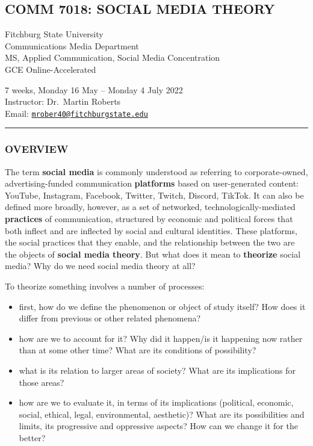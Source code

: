 \documentclass[]{tufte-handout}
\author{Martin Roberts}
\date{2022-05-13}
\providecommand{\tightlist}{%
  \setlength{\itemsep}{0pt}\setlength{\parskip}{0pt}}
\begin{document}
\hypertarget{comm-7018-social-media-theory}{%
\subsection{COMM 7018: SOCIAL MEDIA
THEORY}\label{comm-7018-social-media-theory}}

Fitchburg State University\\
Communications Media Department\\
MS, Applied Communication, Social Media Concentration\\
GCE Online-Accelerated

7 weeks, Monday 16 May -- Monday 4 July 2022\\
Instructor: Dr.~Martin Roberts\\
Email:
\href{mailto:mrober40@fitchburgstate.edu}{\nolinkurl{mrober40@fitchburgstate.edu}}

\begin{center}\rule{0.5\linewidth}{0.5pt}\end{center}

\hypertarget{overview}{%
\subsubsection{OVERVIEW}\label{overview}}

The term \textbf{social media} is commonly understood as referring to
corporate-owned, advertising-funded communication \textbf{platforms}
based on user-generated content: YouTube, Instagram, Facebook, Twitter,
Twitch, Discord, TikTok. It can also be defined more broadly, however,
as a set of networked, technologically-mediated \textbf{practices} of
communication, structured by economic and political forces that both
inflect and are inflected by social and cultural identities. These
platforms, the social practices that they enable, and the relationship
between the two are the objects of \textbf{social media theory}. But
what does it mean to \textbf{theorize} social media? Why do we need
social media theory at all?

To theorize something involves a number of processes:

\begin{itemize}
\tightlist
\item
  first, how do we define the phenomenon or object of study itself? How
  does it differ from previous or other related phenomena?
\item
  how are we to account for it? Why did it happen/is it happening now
  rather than at some other time? What are its conditions of
  possibility?
\item
  what is its relation to larger areas of society? What are its
  implications for those areas?
\item
  how are we to evaluate it, in terms of its implications (political,
  economic, social, ethical, legal, environmental, aesthetic)? What are
  its possibilities and limits, its progressive and oppressive aspects?
  How can we change it for the better?
\end{itemize}
\end{document}
